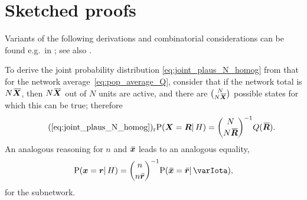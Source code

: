 \documentclass{article}
\theoremstyle{remark}
\theoremstyle{innote}
\newcommand*{\citep}{\parencites}
\renewcommand*{\|}{\mathpunct{|}}%
\newcommand*{\p}{\mathrm{P}}%
\newcommand*{\chap}{ch.}%
\newcommand*{\chaps}{chs}%
\newcommand*{\eg}{{e.g.}}
\newcommand*{\labelbis}[1]{\tag*{(\ref{#1})$_\text{r}$}}
\theoremstyle{simple}
\newcommand*{\widebar}[1]{{\mkern1.5mu\skew{2}\overline{\mkern-1.5mu#1\mkern-1.5mu}\mkern 1.5mu}}
\newcommand*{\av}{\widebar} %
\newcommand*{\sav}{\widebar} %
\newcommand*{\yxx}{x}%
\newcommand*{\yx}{\bm{\yxx}}%
\newcommand*{\yxs}{\sav{\yx}}%
\newcommand*{\yX}{\bm{X}}%
\newcommand*{\yXf}{\av{\yX}}%
\newcommand*{\yr}{\bm{r}}%
\newcommand*{\yrs}{\sav{\yr}}%
\newcommand*{\yR}{\bm{R}}%
\newcommand*{\yRf}{\av{\yR}}%
\newcommand*{\yH}{\varIota}
\begin{document}
  \section{Sketched proofs}
  \label{sec:derivations}

  Variants of the following derivations and combinatorial considerations
  can be found \eg\ in
  \cites[\chaps~I--IV]{whitworth1867_r1965}[\chap~II]{feller1950_r1968}[\chap~3]{jaynes1994_r2003};
  see also \citep{whitworth1897}.

  To derive the joint probability distribution
  \eqref{eq:joint_plaus_N_homog} from that for the network
  average~\eqref{eq:pop_average_Q}, consider that if the network total
  is $N\yXf$, then $N\yXf$ out of $N$ units are active, and there are
  $\tbinom{N}{N\yXf}$ possible states for which this can be true; therefore
  \begin{equation}
    \labelbis{eq:joint_plaus_N_homog}
    \p(\yX = \yR \| H) = \binom{N}{N\yRf}^{-1}Q(\yRf).
  \end{equation}
An analogous reasoning for $n$ and $\yxs$ leads to an analogous equality,
\begin{equation}
  \label{eq:aver_subpop}
  \p(\yx=\yr \| H) = \binom{n}{n\yrs}^{-1} \p(\yxs=\yrs\|\yH),
\end{equation}
for the subnetwork.

\bigskip 
\end{document}
